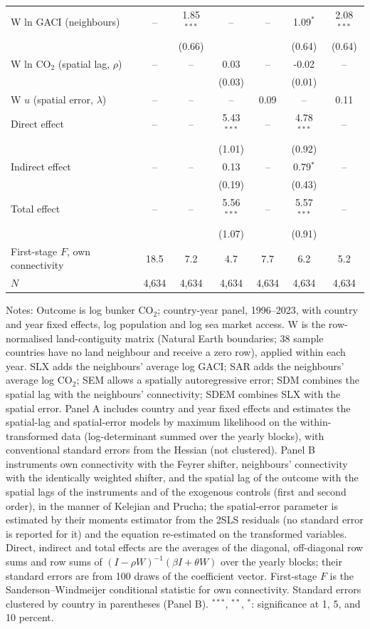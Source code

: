 \documentclass[12pt]{article}
\begin{document}
\begin{table}[H]
{\begin{threeparttable}
\begin{tabular}{lcccccc}
  W ln GACI (neighbours) & -- & 1.85$^{***}$ & -- & -- & 1.09$^{*}$ & 2.08$^{***}$ \\
   &  & (0.66) &  &  & (0.64) & (0.64) \\
  W ln CO$_2$ (spatial lag, $\rho$) & -- & -- & 0.03 & -- & -0.02 & -- \\
   &  &  & (0.03) &  & (0.01) &  \\
  W $u$ (spatial error, $\lambda$) & -- & -- & -- & 0.09 & -- & 0.11 \\
  Direct effect & -- & -- & 5.43$^{***}$ & -- & 4.78$^{***}$ & -- \\
   &  &  & (1.01) &  & (0.92) &  \\
  Indirect effect & -- & -- & 0.13 & -- & 0.79$^{*}$ & -- \\
   &  &  & (0.19) &  & (0.43) &  \\
  Total effect & -- & -- & 5.56$^{***}$ & -- & 5.57$^{***}$ & -- \\
   &  &  & (1.07) &  & (0.91) &  \\
  First-stage $F$, own connectivity & 18.5 & 7.2 & 4.7 & 7.7 & 6.2 & 5.2 \\
  $N$ & 4,634 & 4,634 & 4,634 & 4,634 & 4,634 & 4,634 \\
\bottomrule
\end{tabular}
\begin{tablenotes}[flushleft]
\footnotesize
\item Notes: Outcome is log bunker CO$_2$; country-year panel, 1996--2023, with country and year fixed effects, log population and log sea market access. W is the row-normalised land-contiguity matrix (Natural Earth boundaries; 38 sample countries have no land neighbour and receive a zero row), applied within each year. SLX adds the neighbours' average log GACI; SAR adds the neighbours' average log CO$_2$; SEM allows a spatially autoregressive error; SDM combines the spatial lag with the neighbours' connectivity; SDEM combines SLX with the spatial error. Panel A includes country and year fixed effects and estimates the spatial-lag and spatial-error models by maximum likelihood on the within-transformed data (log-determinant summed over the yearly blocks), with conventional standard errors from the Hessian (not clustered). Panel B instruments own connectivity with the Feyrer shifter, neighbours' connectivity with the identically weighted shifter, and the spatial lag of the outcome with the spatial lags of the instruments and of the exogenous controls (first and second order), in the manner of Kelejian and Prucha; the spatial-error parameter is estimated by their moments estimator from the 2SLS residuals (no standard error is reported for it) and the equation re-estimated on the transformed variables. Direct, indirect and total effects are the averages of the diagonal, off-diagonal row sums and row sums of $(I-\rho W)^{-1}(\beta I + \theta W)$ over the yearly blocks; their standard errors are from 100 draws of the coefficient vector. First-stage $F$ is the Sanderson--Windmeijer conditional statistic for own connectivity. Standard errors clustered by country in parentheses (Panel B). $^{***}$, $^{**}$, $^{*}$: significance at 1, 5, and 10 percent.

\end{tablenotes}
\end{threeparttable}}
\end{table}
\end{document}
